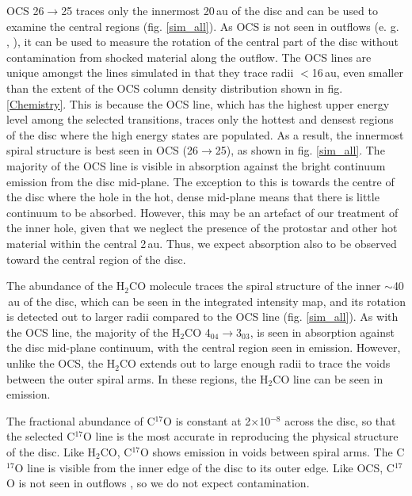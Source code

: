 \documentclass[useAMS,usenatbib]{mn2e}
\begin{document}
OCS 26$\rightarrow$25 traces only the innermost 20$\,$au of the disc and can be used to examine the central regions (fig. \ref{sim_all}). As OCS is not seen in outflows (e. g. \citealt{Stanke2007}, \citealt{VDTak2003}), it can be used to measure the rotation of the central part of the disc without contamination from shocked material along the outflow. The OCS lines are unique amongst the lines simulated in that they trace radii $<$16$\,$au, even smaller than the extent of the OCS column density distribution shown in fig. \ref{Chemistry}. This is because the OCS line, which has the highest upper energy level among the selected transitions, traces only the hottest and densest regions of the disc where the high energy states are populated. As a result, the innermost spiral structure is best seen in OCS (26$\rightarrow$25), as shown in fig. \ref{sim_all}. The majority of the OCS line is visible in absorption against the bright continuum emission from the disc mid-plane. The exception to this is towards the centre of the disc where the hole in the hot, dense mid-plane means that there is little continuum to be absorbed. However, this may be an artefact of our treatment of the inner hole, given that we neglect the presence of the protostar and other hot material within the central 2$\,$au. Thus, we expect absorption also to be observed toward the central region of the disc.\smallskip

The abundance of the H$_2$CO molecule traces the spiral structure of the inner $\sim$40$\,$au of the disc, which can be seen in the integrated intensity map, and its rotation is detected out to larger radii compared to the OCS line (fig. \ref{sim_all}). As with the OCS line, the majority of the H$_2$CO 4$_{04}$$\rightarrow$3$_{03}$, is seen in absorption against the disc mid-plane continuum, with the central region seen in emission. However, unlike the OCS, the H$_2$CO extends out to large enough radii to trace the voids between the outer spiral arms. In these regions, the H$_2$CO line can be seen in emission.\smallskip

The fractional abundance of C$^{17}$O is constant at 2$\times$10$^{-8}$ across the disc, so that the selected C$^{17}$O line is the most accurate in reproducing the physical structure of the disc. Like H$_2$CO, C$^{17}$O shows emission in voids between spiral arms. The C$^{17}$O line is visible from the inner edge of the disc to its outer edge. Like OCS, C$^{17}$O is not seen in outflows \citep{Yildiz2012}, so we do not expect contamination.\smallskip
\end{document}
